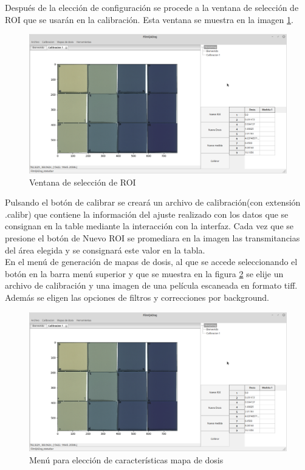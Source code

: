 Después de la elección de configuración se procede a la ventana de selección de ROI que se usarán en la calibración. Esta ventana se muestra en la imagen \ref{fig:menuEleccionDosis}.
\begin{figure}[H]
	\centering
	\includegraphics[width=0.7\linewidth]{images/imagenesDocumentacion/menuEleccionDosis.png}
	\caption{Ventana de selección de ROI }
	\label{fig:menuEleccionDosis}
\end{figure}
Pulsando el botón de calibrar se creará un archivo de calibración(con extensión .calibr) que contiene la información del ajuste realizado con los datos que se consignan en la table mediante la interacción con la interfaz. Cada vez que se presione el botón de Nuevo ROI se promediara en la imagen las transmitancias del área elegida y se consignará este valor en la tabla.\\

En el menú de generación de mapas de dosis, al que se accede seleccionando el botón en la barra menú superior y que se muestra en la figura \ref{fig:menuMapaDosis} se elije un archivo de calibración y una imagen de una película escaneada en formato tiff. Además se eligen las opciones de filtros y correcciones por background.\\
\begin{figure}[H]
	\centering
	\includegraphics[width=0.7\linewidth]{images/imagenesDocumentacion/menuEleccionDosis.png}
	\caption{Menú para elección de características mapa de dosis }
	\label{fig:menuMapaDosis}
\end{figure}


